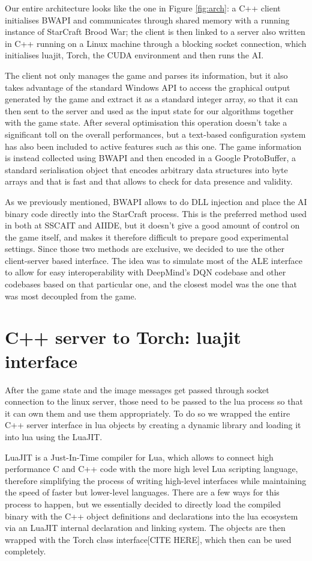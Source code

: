 \documentclass[bsc,frontabs,twoside,singlespacing,parskip,deptreport]{infthesis}     %
\begin{document}
Our entire architecture looks like the one in Figure \ref{fig:arch}: a C++
client initialises BWAPI and communicates through shared memory with a running
instance of StarCraft Brood War; the client is then linked to a server also
written in C++ running on a Linux machine through a blocking socket connection,
which initialises luajit, Torch, the CUDA environment and then runs the AI.

The client not only manages the game and parses its information, but it also
takes advantage of the standard Windows API to access the graphical output
generated by the game and extract it as a standard integer array, so that it can
then sent to the server and used as the input state for our algorithms together
with the game state. After several optimisation this operation doesn't take a
significant toll on the overall performances, but a text-based configuration
system has also been included to active features such as this one. The game
information is instead collected using BWAPI and then encoded in a Google
ProtoBuffer, a standard serialisation object that encodes arbitrary data
structures into byte arrays and that is fast and that allows to check for data
presence and validity.

As we previously mentioned, BWAPI allows to do DLL injection and place the AI
binary code directly into the StarCraft process. This is the preferred method
used in both at SSCAIT and AIIDE, but it doesn't give a good amount of control
on the game itself, and makes it therefore difficult to prepare good
experimental settings. Since those two methods are exclusive, we decided to use
the other client-server based interface. The idea was to simulate most of the
ALE interface to allow for easy interoperability with DeepMind's DQN codebase
and other codebases based on that particular one, and the closest model was the
one that was most decoupled from the game.

\section{C++ server to Torch: luajit interface}

After the game state and the image messages get passed through socket connection
to the linux server, those need to be passed to the lua process so that it can
own them and use them appropriately. To do so we wrapped the entire C++ server
interface in lua objects by creating a dynamic library and loading it into lua
using the LuaJIT.

LuaJIT is a Just-In-Time compiler for Lua, which allows to connect high
performance C and C++ code with the more high level Lua scripting language,
therefore simplifying the process of writing high-level interfaces while
maintaining the speed of faster but lower-level languages. There are a few ways
for this process to happen, but we essentially decided to directly load the
compiled binary with the C++ object definitions and declarations into the lua
ecosystem via an LuaJIT internal declaration and linking system. The objects are
then wrapped with the Torch class interface[CITE HERE], which then can be used
completely.
\end{document}
